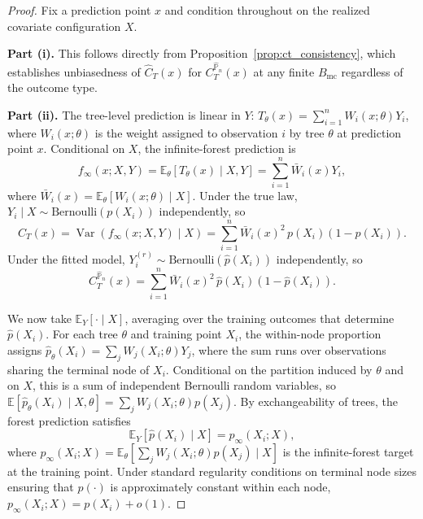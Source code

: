 \documentclass[11pt]{article}
\theoremstyle{plain}
\theoremstyle{definition}
\theoremstyle{remark}
\DeclareMathOperator{\Var}{Var}
\begin{document}
\begin{proof}
	Fix a prediction point $x$ and condition throughout on the realized covariate configuration $X$.
	
	\medskip
	\noindent\textbf{Part (i).}
	This follows directly from Proposition~\ref{prop:ct_consistency}, which establishes unbiasedness of $\widehat{C}_T(x)$ for $C_T^{\widehat{\mathbb{P}}_n}(x)$ at any finite $B_{\mathrm{mc}}$ regardless of the outcome type.
	
	\medskip
	\noindent\textbf{Part (ii).}
	The tree-level prediction is linear in $Y$: $T_\theta(x) = \sum_{i=1}^n W_i(x;\theta) Y_i$, where $W_i(x;\theta)$ is the weight assigned to observation $i$ by tree $\theta$ at prediction point $x$. Conditional on $X$, the infinite-forest prediction is
	\[
	f_\infty(x; X, Y) = \mathbb{E}_\theta[T_\theta(x) \mid X, Y] = \sum_{i=1}^n \bar{W}_i(x) Y_i,
	\]
	where $\bar{W}_i(x) = \mathbb{E}_\theta[W_i(x;\theta) \mid X]$. Under the true law, $Y_i \mid X \sim \mathrm{Bernoulli}(p(X_i))$ independently, so
	\[
	C_T(x) = \Var(f_\infty(x; X, Y) \mid X) = \sum_{i=1}^n \bar{W}_i(x)^2 \, p(X_i)(1 - p(X_i)).
	\]
	Under the fitted model, $Y_i^{(r)} \sim \mathrm{Bernoulli}(\hat{p}(X_i))$ independently, so
	\[
	C_T^{\widehat{\mathbb{P}}_n}(x) = \sum_{i=1}^n \bar{W}_i(x)^2 \, \hat{p}(X_i)(1 - \hat{p}(X_i)).
	\]
	
	We now take $\mathbb{E}_Y[\cdot \mid X]$, averaging over the training outcomes that determine $\hat{p}(X_i)$. For each tree $\theta$ and training point $X_i$, the within-node proportion assigns $\hat{p}_\theta(X_i) = \sum_{j} W_j(X_i;\theta) Y_j$, where the sum runs over observations sharing the terminal node of $X_i$. Conditional on the partition induced by $\theta$ and on $X$, this is a sum of independent Bernoulli random variables, so $\mathbb{E}[\hat{p}_\theta(X_i) \mid X, \theta] = \sum_j W_j(X_i;\theta) p(X_j)$. By exchangeability of trees, the forest prediction satisfies
	\[
	\mathbb{E}_Y[\hat{p}(X_i) \mid X] = p_\infty(X_i; X),
	\]
	where $p_\infty(X_i; X) = \mathbb{E}_\theta[\sum_j W_j(X_i;\theta) p(X_j) \mid X]$ is the infinite-forest target at the training point. Under standard regularity conditions on terminal node sizes ensuring that $p(\cdot)$ is approximately constant within each node, $p_\infty(X_i; X) = p(X_i) + o(1)$.
	

\end{proof}
\end{document}
